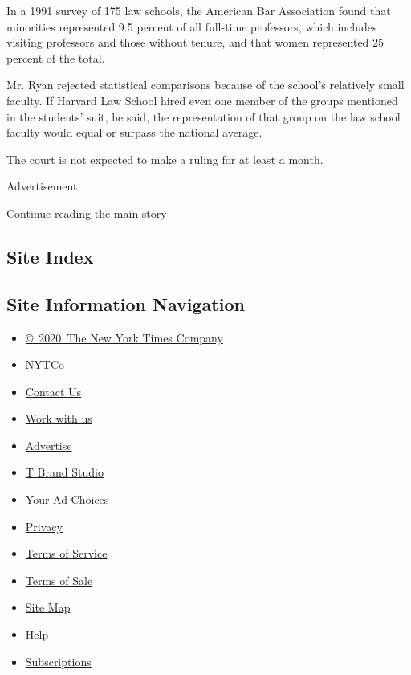 In a 1991 survey of 175 law schools, the American Bar Association found
that minorities represented 9.5 percent of all full-time professors,
which includes visiting professors and those without tenure, and that
women represented 25 percent of the total.

Mr. Ryan rejected statistical comparisons because of the school's
relatively small faculty. If Harvard Law School hired even one member of
the groups mentioned in the students' suit, he said, the representation
of that group on the law school faculty would equal or surpass the
national average.

The court is not expected to make a ruling for at least a month.

Advertisement

\protect\hyperlink{after-bottom}{Continue reading the main story}

\hypertarget{site-index}{%
\subsection{Site Index}\label{site-index}}

\hypertarget{site-information-navigation}{%
\subsection{Site Information
Navigation}\label{site-information-navigation}}

\begin{itemize}
\tightlist
\item
  \href{https://help.nytimes3xbfgragh.onion/hc/en-us/articles/115014792127-Copyright-notice}{©~2020~The
  New York Times Company}
\end{itemize}

\begin{itemize}
\tightlist
\item
  \href{https://www.nytco.com/}{NYTCo}
\item
  \href{https://help.nytimes3xbfgragh.onion/hc/en-us/articles/115015385887-Contact-Us}{Contact
  Us}
\item
  \href{https://www.nytco.com/careers/}{Work with us}
\item
  \href{https://nytmediakit.com/}{Advertise}
\item
  \href{http://www.tbrandstudio.com/}{T Brand Studio}
\item
  \href{https://www.nytimes3xbfgragh.onion/privacy/cookie-policy\#how-do-i-manage-trackers}{Your
  Ad Choices}
\item
  \href{https://www.nytimes3xbfgragh.onion/privacy}{Privacy}
\item
  \href{https://help.nytimes3xbfgragh.onion/hc/en-us/articles/115014893428-Terms-of-service}{Terms
  of Service}
\item
  \href{https://help.nytimes3xbfgragh.onion/hc/en-us/articles/115014893968-Terms-of-sale}{Terms
  of Sale}
\item
  \href{https://spiderbites.nytimes3xbfgragh.onion}{Site Map}
\item
  \href{https://help.nytimes3xbfgragh.onion/hc/en-us}{Help}
\item
  \href{https://www.nytimes3xbfgragh.onion/subscription?campaignId=37WXW}{Subscriptions}
\end{itemize}
